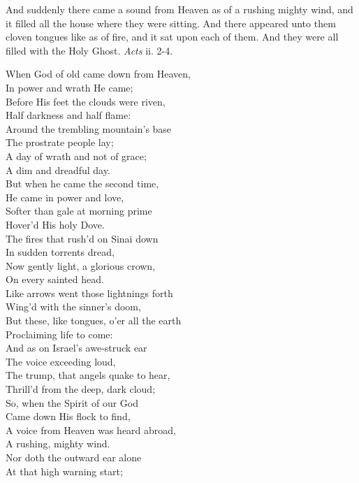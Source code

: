 
And suddenly there came a sound from Heaven as of a rushing mighty wind, and it filled all the house where they were sitting. And there appeared unto them cloven tongues like as of fire, and it sat upon each of them. And they were all filled with the Holy Ghost. \emph{Acts} ii. 2-4.

When God of old came down from Heaven, \\
 In power and wrath He came; \\
 Before His feet the clouds were riven, \\
 Half darkness and half flame: \\
  Around the trembling mountain’s base \\
 The prostrate people lay; \\
 A day of wrath and not of grace; \\
 A dim and dreadful day. \\
  But when he came the second time, \\
 He came in power and love, \\
 Softer than gale at morning prime \\
 Hover’d His holy Dove. \\
  The fires that rush’d on Sinai down \\
 In sudden torrents dread, \\
 Now gently light, a glorious crown, \\
 On every sainted head. \\
  Like arrows went those lightnings forth \\
 Wing’d with the sinner’s doom, \\
 But these, like tongues, o’er all the earth \\
 Proclaiming life to come: \\
  And as on Israel’s awe-struck ear \\
 The voice exceeding loud, \\
 The trump, that angels quake to hear, \\
 Thrill’d from the deep, dark cloud; \\
  So, when the Spirit of our God \\
 Came down His flock to find, \\
 A voice from Heaven was heard abroad, \\
 A rushing, mighty wind. \\
  Nor doth the outward ear alone \\
 At that high warning start; \\
